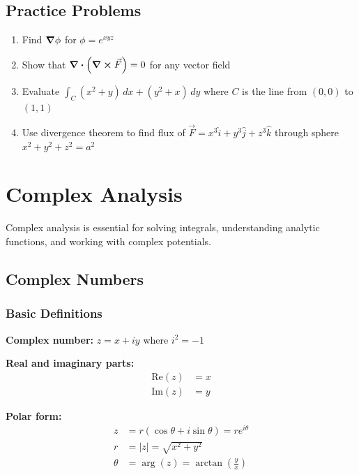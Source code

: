 \documentclass[12pt,a4paper]{article}
\begin{document}
\subsection{Practice Problems}
\begin{enumerate}
    \item Find $\grad\phi$ for $\phi = e^{xyz}$
    \item Show that $\div(\curl\vec{F}) = 0$ for any vector field
    \item Evaluate $\int_C (x^2 + y) \, dx + (y^2 + x) \, dy$ where $C$ is the line from $(0,0)$ to $(1,1)$
    \item Use divergence theorem to find flux of $\vec{F} = x^3\hat{i} + y^3\hat{j} + z^3\hat{k}$ through sphere $x^2 + y^2 + z^2 = a^2$
\end{enumerate}

\newpage

\section{Complex Analysis}
Complex analysis is essential for solving integrals, understanding analytic functions, and working with complex potentials.

\subsection{Complex Numbers}
\subsubsection{Basic Definitions}
\begin{formulabox}
\textbf{Complex number:} $z = x + iy$ where $i^2 = -1$

\textbf{Real and imaginary parts:}
\begin{align}
\text{Re}(z) &= x \\
\text{Im}(z) &= y
\end{align}

\textbf{Polar form:}
\begin{align}
z &= r(\cos\theta + i\sin\theta) = re^{i\theta} \\
r &= |z| = \sqrt{x^2 + y^2} \\
\theta &= \arg(z) = \arctan\left(\frac{y}{x}\right)
\end{align}
\end{formulabox}
\end{document}

